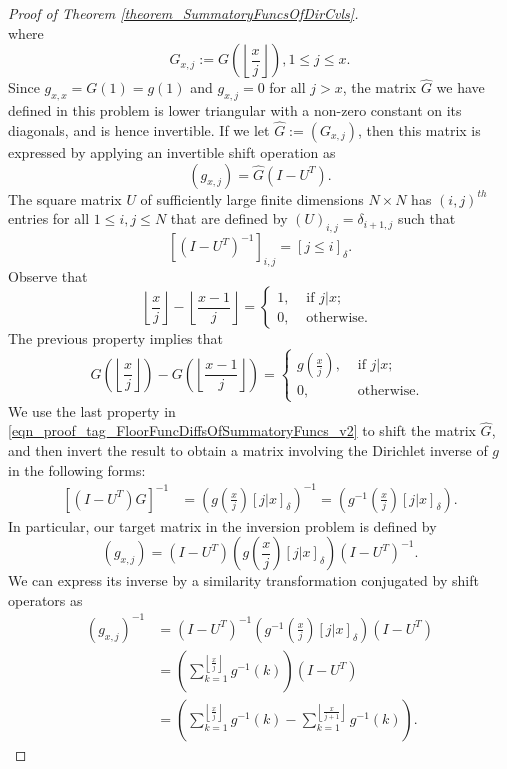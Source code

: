 \documentclass[11pt,reqno,a4letter]{article}
\numberwithin{figure}{section}
\numberwithin{table}{section}
\newcommand{\Iverson}[1]{\ensuremath{\left[#1\right]_{\delta}}}
\newcommand{\floor}[1]{\left\lfloor #1 \right\rfloor}
\newcommand{\Floor}[2]{\ensuremath{\left\lfloor \frac{#1}{#2} \right\rfloor}}
\theoremstyle{plain}
\numberwithin{theorem}{section}
\theoremstyle{definition}
\begin{document}
\begin{proof}[Proof of Theorem \ref{theorem_SummatoryFuncsOfDirCvls}]
\[\] 
where 
\[
G_{x,j} := G\left(\Floor{x}{j}\right), 1 \leq j \leq x. 
\]
Since $g_{x,x} = G(1) = g(1)$ and $g_{x,j} = 0$ for all $j > x$, 
the matrix $\widehat{G}$ we have defined in this problem is lower triangular with a non-zero 
constant on its diagonals, and is hence invertible. 
If we let $\hat{G} := (G_{x,j})$, then this matrix is 
expressed by applying an invertible shift operation as 
\[
(g_{x,j}) = \hat{G} (I - U^{T}). 
\]
The square matrix $U$ of sufficiently large finite dimensions $N \times N$ 
has $(i,j)^{th}$ entries for all $1 \leq i,j \leq N$ that are defined by 
$(U)_{i,j} = \delta_{i+1,j}$ such that 
\[
\left[(I - U^T)^{-1}\right]_{i,j} = \Iverson{j \leq i}. 
\]
Observe that 
\[
\Floor{x}{j} - \Floor{x-1}{j} = \begin{cases} 
     1, & \text{ if $j|x$; } \\ 
     0, & \text{ otherwise. } 
     \end{cases} 
\] 
The previous property implies that 
\begin{equation} 
\label{eqn_proof_tag_FloorFuncDiffsOfSummatoryFuncs_v2} 
G\left(\floor{\frac{x}{j}}\right) - G\left(\floor{\frac{x-1}{j}}\right) = 
     \begin{cases} 
     g\left(\frac{x}{j}\right), & \text{ if $j | x$; } \\ 
     0, & \text{ otherwise. } 
     \end{cases}
\end{equation} 
We use the last property in \eqref{eqn_proof_tag_FloorFuncDiffsOfSummatoryFuncs_v2} 
to shift the matrix $\hat{G}$, and then invert the result to obtain a matrix involving the 
Dirichlet inverse of $g$ in the following forms: 
\begin{align*} 
\left[(I-U^{T}) \hat{G}\right]^{-1} & = \left(g\left(\frac{x}{j}\right) \Iverson{j|x}\right)^{-1} = 
     \left(g^{-1}\left(\frac{x}{j}\right) \Iverson{j|x}\right). 
\end{align*} 
In particular, our target matrix in the inversion problem is defined by 
$$(g_{x,j}) = (I-U^{T}) \left(g\left(\frac{x}{j}\right) \Iverson{j|x}\right) (I-U^{T})^{-1}.$$
We can express its inverse by a similarity transformation conjugated by shift operators as 
\begin{align*} 
(g_{x,j})^{-1} & = (I-U^{T})^{-1} \left(g^{-1}\left(\frac{x}{j}\right) \Iverson{j|x}\right) (I-U^{T}) \\ 
     & = \left(\sum_{k=1}^{\floor{\frac{x}{j}}} g^{-1}(k)\right) (I-U^{T}) \\ 
     & = \left(\sum_{k=1}^{\floor{\frac{x}{j}}} g^{-1}(k) - \sum_{k=1}^{\floor{\frac{x}{j+1}}} g^{-1}(k)\right). 

\end{align*}
\end{proof}
\end{document}
